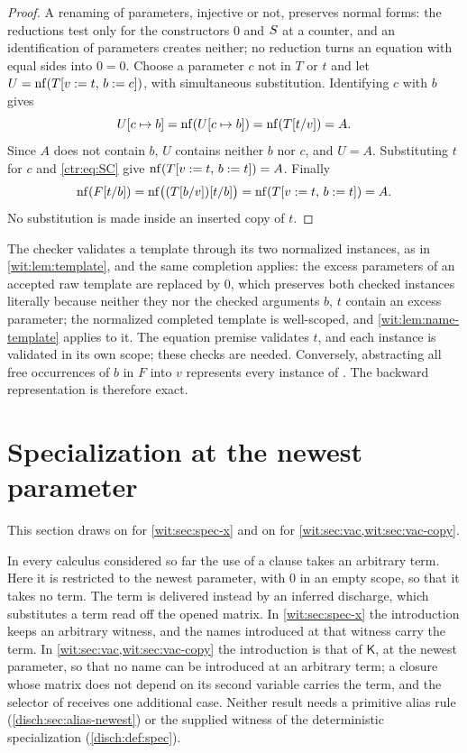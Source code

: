 \begin{proof}
A renaming of parameters, injective or not, preserves normal forms: the
reductions test only for the constructors $0$ and $S$ at a counter, and
an identification of parameters creates neither; no reduction turns an
equation with equal sides into $0=0$.  Choose a parameter $c$ not in $T$ or
$t$ and let $U=\operatorname{nf}(T[v:=t,\,b:=c])$, with simultaneous substitution.
Identifying $c$ with $b$ gives
\[
 U[c\mapsto b]=\operatorname{nf}(U[c\mapsto b])=\operatorname{nf}(T[t/v])=A .
\]
Since $A$ does not contain $b$, $U$ contains neither $b$ nor $c$, and
$U=A$.  Substituting $t$ for $c$ and \eqref{ctr:eq:SC} give
$\operatorname{nf}(T[v:=t,\,b:=t])=A$.  Finally
\[
 \operatorname{nf}(F[t/b])=\operatorname{nf}\bigl((T[b/v])[t/b]\bigr)=\operatorname{nf}(T[v:=t,\,b:=t])=A .
\]
No substitution is made inside an inserted copy of $t$.
\end{proof}

The checker validates a template through its two normalized instances, as
in \cref{wit:lem:template}, and the same completion applies: the excess
parameters of an accepted raw template are replaced by $0$, which preserves
both checked instances literally because neither they nor the checked
arguments $b$, $t$ contain an excess parameter; the normalized completed
template is well-scoped, and \cref{wit:lem:name-template} applies to it.
The equation premise validates $t$, and each instance is validated in its
own scope; these checks are needed.  Conversely, abstracting all free
occurrences of $b$ in $F$ into $v$ represents every instance of
.  The backward representation is therefore exact.

\section{Specialization at the newest parameter}
\label{wit:sec:spec}

This section draws on  for
\cref{wit:sec:spec-x} and on  for
\cref{wit:sec:vac,wit:sec:vac-copy}.

In every calculus considered so far the use of a clause takes an arbitrary
term.  Here it is restricted to the newest parameter, with $0$ in an empty
scope, so that it takes no term.  The term is delivered instead by an
inferred discharge, which substitutes a term read off the opened matrix.  In
\cref{wit:sec:spec-x} the introduction keeps an arbitrary witness, and the
names introduced at that witness carry the term.  In
\cref{wit:sec:vac,wit:sec:vac-copy} the introduction is that of
$\mathsf K$, at the newest parameter, so that no name can be introduced at
an arbitrary term; a closure whose matrix does not depend on its second
variable carries the term, and the selector of  receives
one additional case.  Neither result needs a primitive alias rule
(\cref{disch:sec:alias-newest}) or the supplied witness of the
deterministic specialization (\cref{disch:def:spec}).

